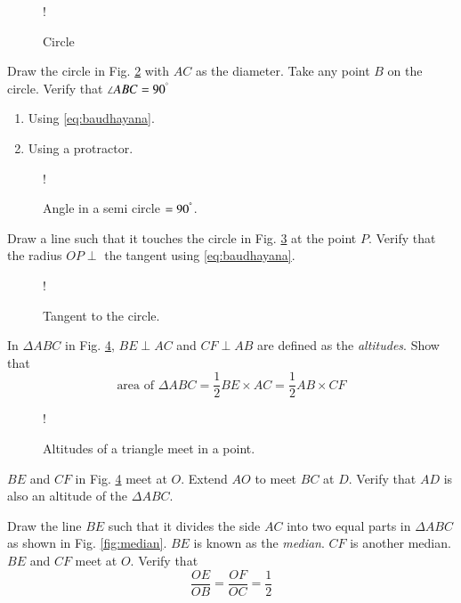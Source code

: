 \documentclass[journal,12pt,twocolumn]{IEEEtran}
\begin{document}
\begin{figure}[!h]
\centering
\resizebox {\columnwidth} {!} {

}
\caption{Circle}
\label{fig:pi}
\end{figure}
\begin{problem}
Draw the circle in Fig. \ref{fig:semi_circle}  with $AC$ as the diameter.  Take any point $B$ on the circle.  Verify that $\angle ABC = 90^{\degree}$ 
\begin{enumerate}
\item Using \eqref{eq:baudhayana}.
\item Using a protractor.
\end{enumerate}
\end{problem}

\begin{figure}[!h]
\centering
\resizebox {\columnwidth} {!} {

}
\caption{Angle in a semi circle $= 90^{\degree}$.}
\label{fig:semi_circle}
\end{figure}
%
\begin{problem}
Draw a line such that it touches the circle in Fig. \ref{fig:tangent}  at the point $P$. Verify that the radius $OP \perp$ the tangent using \eqref{eq:baudhayana}.
\end{problem}
%
\begin{figure}[!h]
\centering
\resizebox {\columnwidth} {!} {

}
\caption{Tangent to the circle.}
\label{fig:tangent}
\end{figure}
%
%
\begin{problem}
In $ \Delta ABC$ in Fig. \ref{fig:altitude}, $BE \perp AC$ and $CF \perp AB$ are defined as the {\em altitudes}.  Show that 
\begin{equation}
\text{area of } \Delta ABC = \frac{1}{2}BE \times AC = \frac{1}{2} AB \times CF
\end{equation}
\end{problem}
%
\begin{figure}[!h]
\centering
\resizebox {\columnwidth} {!} {

}
\caption{Altitudes of a triangle meet in a point.}
\label{fig:altitude}
\end{figure}
%
\begin{problem}
$BE$ and $CF$ in Fig. \ref{fig:altitude} meet at $O$.  Extend $AO$ to meet $BC$ at $D$. Verify that $AD$ is also an altitude of the $\Delta ABC$.
\end{problem}
%
\begin{problem}
Draw the line $BE$ such that it divides the side $AC$ into two equal parts in $ \Delta ABC$ as shown in Fig. \ref{fig:median}. $BE$ is known as the {\em median}.  $CF$ is another median.
$BE$ and $CF$ meet at $O$.  Verify that
\begin{equation}
\frac{OE}{OB} = \frac{OF}{OC} = \frac{1}{2}
\end{equation}
\end{problem}
\end{document}
